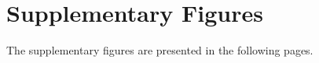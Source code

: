 \chapter{Supplementary Figures}
The supplementary figures are presented in the following pages.


\clearpage

\clearpage

\clearpage

\clearpage

\clearpage

\clearpage

\clearpage

\clearpage

\clearpage

